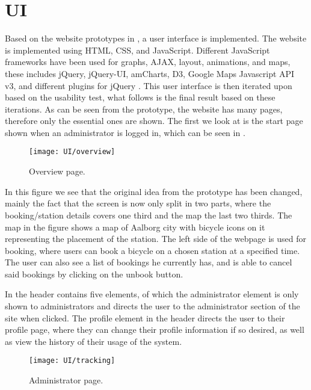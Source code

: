 \section{UI}

Based on the website prototypes in , a user interface is implemented.
The website is implemented using HTML, CSS, and JavaScript. 
Different JavaScript frameworks have been used for graphs, AJAX, layout, animations, and maps, these includes jQuery, jQuery-UI, amCharts, D3, Google Maps Javascript API v3, and different plugins for jQuery \citep{misc:googlehostedlibs, misc:d3js, misc:googlemapsapi, misc:amcharts}.
This user interface is then iterated upon based on the usability test, what follows is the final result based on these iterations. 
As can be seen from the prototype, the website has many pages, therefore only the essential ones are shown.
The first we look at is the start page shown when an administrator is logged in, which can be seen in .

\begin{figure}[h]
	\centering
	\texttt{[image: UI/overview]}
	\caption{Overview page.}\label{fig:UI-overview}
\end{figure}

In this figure we see that the original idea from the prototype has been changed, mainly the fact that the screen is now only split in two parts, where the booking/station details covers one third and the map the last two thirds.
The map in the figure shows a map of Aalborg city with bicycle icons on it representing the placement of the station.
The left side of the webpage is used for booking, where users can book a bicycle on a chosen station at a specified time.
The user can also see a list of bookings he currently has, and is able to cancel said bookings by clicking on the unbook button.

In  the header contains five elements, of which the administrator element is only shown to administrators and directs the user to the administrator section of the site when clicked.
The profile element in the header directs the user to their profile page, where they can change their profile information if so desired, as well as view the history of their usage of the system.

\begin{figure}[h]
	\centering
	\texttt{[image: UI/tracking]}
	\caption{Administrator page.}\label{fig:UI-admin}
\end{figure}

